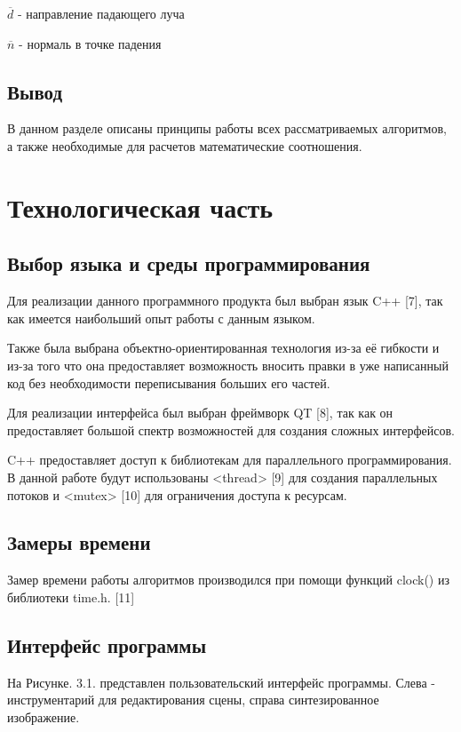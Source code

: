 \documentclass[12pt]{report}
\begin{document}
	$\overline{d}$ - направление падающего луча
	
	$\overline{n}$ - нормаль в точке падения

	\section*{Вывод}

	В данном разделе описаны принципы работы всех рассматриваемых алгоритмов, а также необходимые для расчетов математические соотношения.
	
	\chapter{Технологическая часть}
	
	\section{Выбор языка и среды программирования}
	
		Для реализации данного программного продукта был выбран язык C++ [7], так как имеется наибольший опыт работы с данным языком.
		
		Также была выбрана объектно-ориентированная технология из-за её гибкости и из-за того что она предоставляет возможность вносить правки в уже написанный код без необходимости переписывания больших его частей.
		
		Для реализации интерфейса был выбран фреймворк QT [8], так как он предоставляет большой спектр возможностей для создания сложных интерфейсов.
		
		C++ предоставляет доступ к библиотекам для параллельного программирования. В данной работе будут использованы <thread> [9] для создания параллельных потоков и <mutex> [10] для ограничения доступа к ресурсам.
		
	\section{Замеры времени}
	Замер времени работы алгоритмов производился при помощи функций clock() из библиотеки time.h. [11]
	
	\newpage
	\section{Интерфейс программы}
	
	На Рисунке. 3.1. представлен пользовательский интерфейс программы. Слева - инструментарий для редактирования сцены, справа синтезированное изображение.
	
\end{document}
